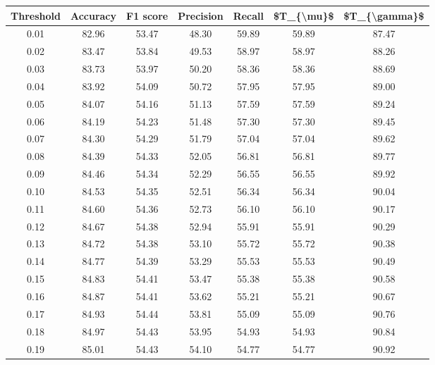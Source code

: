\begin{tabular}{|c|c|c|c|c|c|c|}
\hline
 Threshold &  Accuracy &  F1 score &  Precision &  Recall &  \$T\_\{\textbackslash mu\}\$ &  \$T\_\{\textbackslash gamma\}\$ \\
\hline
      0.01 &     82.96 &     53.47 &      48.30 &   59.89 &      59.89 &         87.47 \\
      0.02 &     83.47 &     53.84 &      49.53 &   58.97 &      58.97 &         88.26 \\
      0.03 &     83.73 &     53.97 &      50.20 &   58.36 &      58.36 &         88.69 \\
      0.04 &     83.92 &     54.09 &      50.72 &   57.95 &      57.95 &         89.00 \\
      0.05 &     84.07 &     54.16 &      51.13 &   57.59 &      57.59 &         89.24 \\
      0.06 &     84.19 &     54.23 &      51.48 &   57.30 &      57.30 &         89.45 \\
      0.07 &     84.30 &     54.29 &      51.79 &   57.04 &      57.04 &         89.62 \\
      0.08 &     84.39 &     54.33 &      52.05 &   56.81 &      56.81 &         89.77 \\
      0.09 &     84.46 &     54.34 &      52.29 &   56.55 &      56.55 &         89.92 \\
      0.10 &     84.53 &     54.35 &      52.51 &   56.34 &      56.34 &         90.04 \\
      0.11 &     84.60 &     54.36 &      52.73 &   56.10 &      56.10 &         90.17 \\
      0.12 &     84.67 &     54.38 &      52.94 &   55.91 &      55.91 &         90.29 \\
      0.13 &     84.72 &     54.38 &      53.10 &   55.72 &      55.72 &         90.38 \\
      0.14 &     84.77 &     54.39 &      53.29 &   55.53 &      55.53 &         90.49 \\
      0.15 &     84.83 &     54.41 &      53.47 &   55.38 &      55.38 &         90.58 \\
      0.16 &     84.87 &     54.41 &      53.62 &   55.21 &      55.21 &         90.67 \\
      0.17 &     84.93 &     54.44 &      53.81 &   55.09 &      55.09 &         90.76 \\
      0.18 &     84.97 &     54.43 &      53.95 &   54.93 &      54.93 &         90.84 \\
      0.19 &     85.01 &     54.43 &      54.10 &   54.77 &      54.77 &         90.92 \\

\end{tabular}
